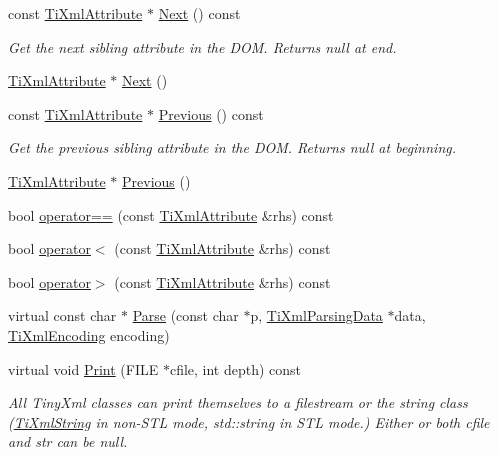 \begin{DoxyCompactItemize}
const \hyperlink{classTiXmlAttribute}{TiXmlAttribute} $\ast$ \hyperlink{classTiXmlAttribute_a776478980776a024f7c2846eec640f65}{Next} () const 
\begin{DoxyCompactList}\small\item\em Get the next sibling attribute in the DOM. Returns null at end. \item\end{DoxyCompactList}\item 
\hyperlink{classTiXmlAttribute}{TiXmlAttribute} $\ast$ \hyperlink{classTiXmlAttribute_a138320aa7793b148ba7e5bd0a0ea4db6}{Next} ()
\item 
const \hyperlink{classTiXmlAttribute}{TiXmlAttribute} $\ast$ \hyperlink{classTiXmlAttribute_a54a5f8730c7b02b9a41b74e12e27fe86}{Previous} () const 
\begin{DoxyCompactList}\small\item\em Get the previous sibling attribute in the DOM. Returns null at beginning. \item\end{DoxyCompactList}\item 
\hyperlink{classTiXmlAttribute}{TiXmlAttribute} $\ast$ \hyperlink{classTiXmlAttribute_ae4dabc932cba945ed1e92fec5f121193}{Previous} ()
\item 
bool \hyperlink{classTiXmlAttribute_ae48c2a65b520d453914ce4e845d607cf}{operator==} (const \hyperlink{classTiXmlAttribute}{TiXmlAttribute} \&rhs) const 
\item 
bool \hyperlink{classTiXmlAttribute_adb8b6f2cad5948e73e383182e7ce10de}{operator$<$} (const \hyperlink{classTiXmlAttribute}{TiXmlAttribute} \&rhs) const 
\item 
bool \hyperlink{classTiXmlAttribute_a867562769ef9778c1690cd373246b05b}{operator$>$} (const \hyperlink{classTiXmlAttribute}{TiXmlAttribute} \&rhs) const 
\item 
virtual const char $\ast$ \hyperlink{classTiXmlAttribute_ad62774421b814894b995af3b5d231dda}{Parse} (const char $\ast$p, \hyperlink{classTiXmlParsingData}{TiXmlParsingData} $\ast$data, \hyperlink{tinyxml_8h_a88d51847a13ee0f4b4d320d03d2c4d96}{TiXmlEncoding} encoding)
\item 
virtual void \hyperlink{classTiXmlAttribute_acc04956c1d5c4c31fe74f7a7528d109a}{Print} (FILE $\ast$cfile, int depth) const 
\begin{DoxyCompactList}\small\item\em All TinyXml classes can print themselves to a filestream or the string class (\hyperlink{classTiXmlString}{TiXmlString} in non-\/STL mode, std::string in STL mode.) Either or both cfile and str can be null. \item\end{DoxyCompactList}\item 

\end{DoxyCompactItemize}
